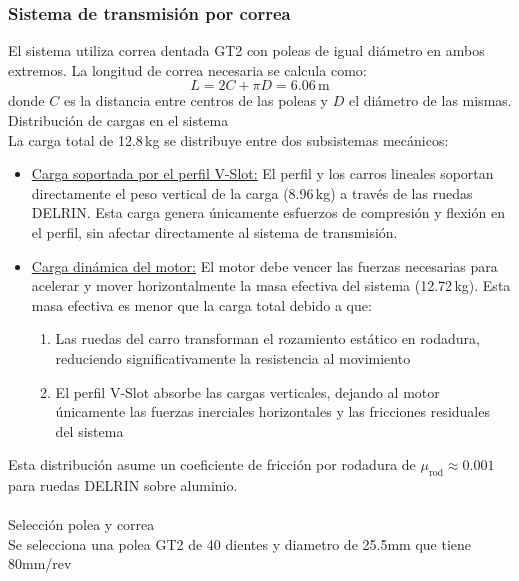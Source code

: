 \subsubsection{Sistema de transmisión por correa}
El sistema utiliza correa dentada GT2 con poleas de igual diámetro en ambos extremos. La longitud de correa necesaria se calcula como:
\begin{equation}
L = 2C + \pi D = 6.06\,\text{m}
\label{eq:longitud_correa}
\end{equation}
donde $C$ es la distancia entre centros de las poleas y $D$ el diámetro de las mismas. \\

Distribución de cargas en el sistema\\
\noindent
La carga total de 12.8\,kg se distribuye entre dos subsistemas mecánicos:

\begin{itemize}[label=$\bullet$]
    \item \underline{Carga soportada por el perfil V-Slot:} El perfil y los carros lineales soportan directamente el peso vertical de la carga (8.96\,kg) a través de las ruedas DELRIN. Esta carga genera únicamente esfuerzos de compresión y flexión en el perfil, sin afectar directamente al sistema de transmisión.
    
    \item \underline{Carga dinámica del motor:} El motor debe vencer las fuerzas necesarias para acelerar y mover horizontalmente la masa efectiva del sistema (12.72\,kg). Esta masa efectiva es menor que la carga total debido a que:
    \begin{enumerate}
        \item Las ruedas del carro transforman el rozamiento estático en rodadura, reduciendo significativamente la resistencia al movimiento
        \item El perfil V-Slot absorbe las cargas verticales, dejando al motor únicamente las fuerzas inerciales horizontales y las fricciones residuales del sistema
    \end{enumerate}
\end{itemize}

Esta distribución asume un coeficiente de fricción por rodadura de $\mu_{\text{rod}} \approx 0.001$ para ruedas DELRIN sobre aluminio.\\ \\
Selección polea y correa\\
\noindent
Se selecciona una polea GT2 de 40 dientes y diametro de 25.5mm que tiene 80mm/rev

